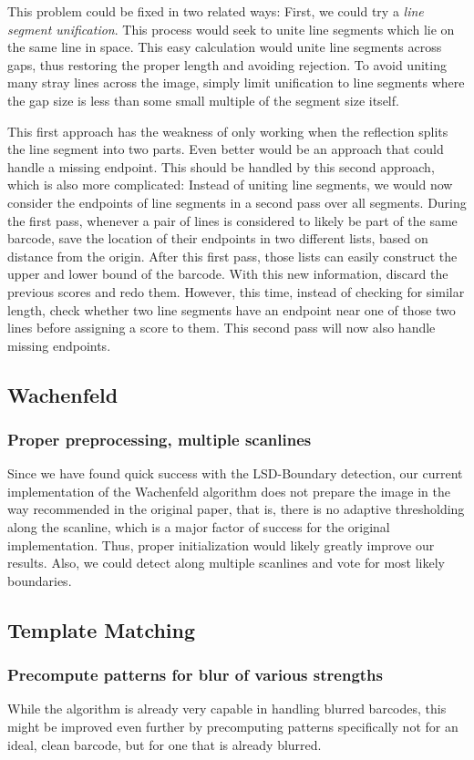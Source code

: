 This problem could be fixed in two related ways: First, we could try a \emph{line segment unification}. This process would seek to unite line segments which lie on the same line in space. This easy calculation would unite line segments across gaps, thus restoring the proper length and avoiding rejection. To avoid uniting many stray lines across the image, simply limit unification to line segments where the gap size is less than some small multiple of the segment size itself.

This first approach has the weakness of only working when the reflection splits the line segment into two parts. Even better would be an approach that could handle a missing endpoint. This should be handled by this second approach, which is also more complicated: Instead of uniting line segments, we would now consider the endpoints of line segments in a second pass over all segments. During the first pass, whenever a pair of lines is considered to likely be part of the same barcode, save the location of their endpoints in two different lists, based on distance from the origin. After this first pass, those lists can easily construct the upper and lower bound of the barcode. With this new information, discard the previous scores and redo them. However, this time, instead of checking for similar length, check whether two line segments have an endpoint near one of those two lines before assigning a score to them. This second pass will now also handle missing endpoints.

\subsection{Wachenfeld}
\subsubsection*{Proper preprocessing, multiple scanlines}

Since we have found quick success with the LSD-Boundary detection, our current implementation of the Wachenfeld algorithm does not prepare the image in the way recommended in the original paper, that is, there is no adaptive thresholding along the scanline, which is a major factor of success for the original implementation. Thus, proper initialization would likely greatly improve our results. Also, we could detect along multiple scanlines and vote for most likely boundaries.

\subsection{Template Matching}
\subsubsection*{Precompute patterns for blur of various strengths}

While the algorithm is already very capable in handling blurred barcodes, this might be improved even further by precomputing patterns specifically not for an ideal, clean barcode, but for one that is already blurred.
